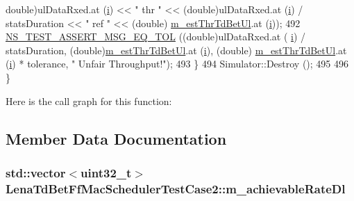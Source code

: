 \begin{DoxyCode}
      double)ulDataRxed.at (\hyperlink{bernuolliDistribution_8m_a6f6ccfcf58b31cb6412107d9d5281426}{i}) << \textcolor{stringliteral}{"  thr "} << (double)ulDataRxed.at (\hyperlink{bernuolliDistribution_8m_a6f6ccfcf58b31cb6412107d9d5281426}{i}) / statsDuration << \textcolor{stringliteral}{" ref "} << (double)
      \hyperlink{classLenaTdBetFfMacSchedulerTestCase2_ae303ffad7a84599cdc5d9719e943f4cb}{m\_estThrTdBetUl}.at (\hyperlink{bernuolliDistribution_8m_a6f6ccfcf58b31cb6412107d9d5281426}{i}));
492       \hyperlink{group__testing_ga9e7861b56b4e70db3b56044cb7a28e41}{NS\_TEST\_ASSERT\_MSG\_EQ\_TOL} ((\textcolor{keywordtype}{double})ulDataRxed.at (
      \hyperlink{bernuolliDistribution_8m_a6f6ccfcf58b31cb6412107d9d5281426}{i}) / statsDuration, (double)\hyperlink{classLenaTdBetFfMacSchedulerTestCase2_ae303ffad7a84599cdc5d9719e943f4cb}{m\_estThrTdBetUl}.at (\hyperlink{bernuolliDistribution_8m_a6f6ccfcf58b31cb6412107d9d5281426}{i}), (double)
      \hyperlink{classLenaTdBetFfMacSchedulerTestCase2_ae303ffad7a84599cdc5d9719e943f4cb}{m\_estThrTdBetUl}.at (\hyperlink{bernuolliDistribution_8m_a6f6ccfcf58b31cb6412107d9d5281426}{i}) * tolerance, \textcolor{stringliteral}{" Unfair Throughput!"});
493     \}
494   Simulator::Destroy ();
495 
496 \}
\end{DoxyCode}


Here is the call graph for this function\+:




\subsection{Member Data Documentation}
\subsubsection[{\texorpdfstring{m\+\_\+achievable\+Rate\+Dl}{m_achievableRateDl}}]{\setlength{\rightskip}{0pt plus 5cm}std\+::vector$<$uint32\+\_\+t$>$ Lena\+Td\+Bet\+Ff\+Mac\+Scheduler\+Test\+Case2\+::m\+\_\+achievable\+Rate\+Dl\hspace{0.3cm}{\ttfamily [private]}}\hypertarget{classLenaTdBetFfMacSchedulerTestCase2_af342b9db780045b97bfe39fef96fea60}{}\label{classLenaTdBetFfMacSchedulerTestCase2_af342b9db780045b97bfe39fef96fea60}
